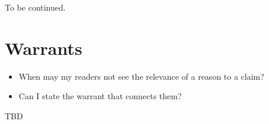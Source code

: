 \documentclass{farlamp}
\begin{document}
To be continued.


\section{Warrants}

\begin{itemize}
\item When may my readers not see the relevance of a reason to a claim?
\item Can I state the warrant that connects them?
\end{itemize}

TBD


\begin{FlushLeft}
\printbibliography
\end{FlushLeft}
\end{document}
